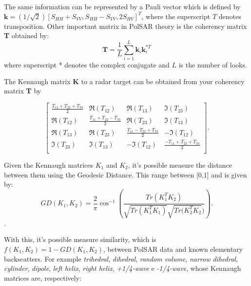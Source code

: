 \documentclass[conference]{IEEEtran}
\begin{document}
The same information can be represented by a Pauli vector which is defined by $\textbf{k} = (1/\sqrt{2})[S_{HH} + S_{VV}, S_{HH} - S_{VV}, 2S_{HV}]^T$, where the superscript $T$ denotes transposition. Other important matrix in PolSAR theory is the coherency matrix \textbf{T} obtained by:
\begin{displaymath}
\textbf{T} = \frac{1}{L} \sum_{i=1}^{L}\textbf{k}_i \textbf{k}_i^{*T}
\end{displaymath}
where superscript * denotes the complex conjugate and $L$ is the number of looks.

The Kennaugh matrix \textbf{K} to a radar target can be obtained from your coherency matrix \textbf{T} by

\[
\begin{bmatrix}
\frac{ T_{11} + T_{22} + T_{33} }{2} & \Re(T_{12}) & \Re(T_{13}) & \Im(T_{23})\\
\Re(T_{12}) & \frac{T_{11} + T_{22} - T_{33}}{2} & \Re(T_{23}) & \Im(T_{13})\\
\Re(T_{13}) & \Re(T_{23}) & \frac{ T_{11} - T_{22} + T_{33} }{2} & -\Im(T_{12})\\
\Im(T_{23}) & \Im(T_{13}) & -\Im(T_{12}) & \frac{ -T_{11} + T_{22} + T_{33} }{2}\\
\end{bmatrix}
.\]

Given the Kennaugh matrices \textbf{$K_1$} and \textbf{$K_2$}, it's possible measure the distance between them using the Geodesic Distance\cite{b1}. This range between [0,1] and is given by:
\begin{displaymath}
GD(K_1, K_2) = \frac{2}{\pi} \cos^{-1} \left(\frac{Tr(K_1^T K_2)}{\sqrt{Tr(K_1^T K_1)} \sqrt{Tr(K_2^T K_2})} \right).
\end{displaymath}.

With this, it's possible measure similarity, which is $f(K_1, K_2) = 1 - GD(K_1, K_2)$, between PolSAR data and known elementary backscatters\cite{b1}. For example \textit{trihedral}, \textit{dihedral}, \textit{random volume}, \textit{narrow dihedral}, \textit{cylinder}, \textit{dipole}, \textit{left helix}, \textit{right helix}, \textit{+1/4-wave} e \textit{-1/4-wave}, whose Kennaugh matrices are, respectively:
\end{document}

